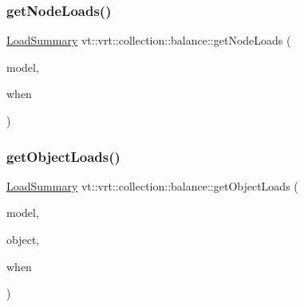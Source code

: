 \mbox{\label{namespacevt_1_1vrt_1_1collection_1_1balance_a3e23892df34e34f78bfa995cad0aa98e}} 
\subsubsection{\texorpdfstring{get\+Node\+Loads()}{getNodeLoads()}}
{\footnotesize\ttfamily \hyperlink{structvt_1_1vrt_1_1collection_1_1balance_1_1_load_summary}{Load\+Summary} vt\+::vrt\+::collection\+::balance\+::get\+Node\+Loads (\begin{DoxyParamCaption}\item[{std\+::shared\+\_\+ptr$<$ \hyperlink{structvt_1_1vrt_1_1collection_1_1balance_1_1_load_model}{Load\+Model} $>$}]{model,  }\item[{\hyperlink{structvt_1_1vrt_1_1collection_1_1balance_1_1_phase_offset}{Phase\+Offset}}]{when }\end{DoxyParamCaption})}

\mbox{\label{namespacevt_1_1vrt_1_1collection_1_1balance_ae3bc5e1c68d2f55908748501fcba9146}} 
\subsubsection{\texorpdfstring{get\+Object\+Loads()}{getObjectLoads()}\hspace{0.1cm}{\footnotesize\ttfamily [1/2]}}
{\footnotesize\ttfamily \hyperlink{structvt_1_1vrt_1_1collection_1_1balance_1_1_load_summary}{Load\+Summary} vt\+::vrt\+::collection\+::balance\+::get\+Object\+Loads (\begin{DoxyParamCaption}\item[{std\+::shared\+\_\+ptr$<$ \hyperlink{structvt_1_1vrt_1_1collection_1_1balance_1_1_load_model}{Load\+Model} $>$}]{model,  }\item[{\hyperlink{namespacevt_1_1vrt_1_1collection_1_1balance_a9f5b53fafb270212279a4757d2c4cd28}{Element\+I\+D\+Struct}}]{object,  }\item[{\hyperlink{structvt_1_1vrt_1_1collection_1_1balance_1_1_phase_offset}{Phase\+Offset}}]{when }\end{DoxyParamCaption})}

